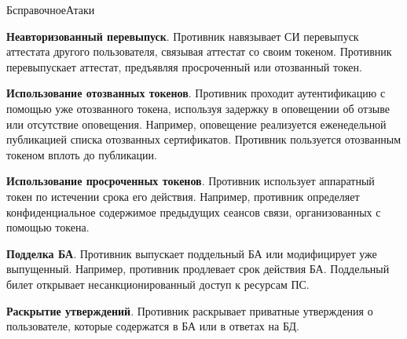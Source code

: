 \begin{appendix}{Б}{справочное}{Атаки}

{\bf Неавторизованный перевыпуск}. 
Противник навязывает СИ перевыпуск аттестата
другого пользователя, связывая аттестат со своим токеном.
Противник перевыпускает аттестат, предъявляя просроченный 
или отозванный токен.


{\bf Использование отозванных токенов}. 
Противник проходит аутентификацию с помощью уже отозванного токена,
используя задержку в оповещении об отзыве или отсутствие оповещения.
%
Например, оповещение реализуется еженедельной публикацией списка 
отозванных сертификатов. Противник пользуется отозванным токеном вплоть до 
публикации. 


{\bf Использование просроченных токенов}. 
Противник использует аппаратный токен по истечении срока его действия.
Например, противник определяет конфиденциальное содержимое предыдущих 
сеансов связи, организованных с помощью токена.


\label{ATK.TM}

{\bf Подделка БА}.
Противник выпускает поддельный БА или модифицирует уже выпущенный.
%
Например, противник продлевает срок действия БА.
%
Поддельный билет открывает несанкционированный доступ к ресурсам ПС.


{\bf Раскрытие утверждений}.
Противник раскрывает приватные утверждения о пользователе,
которые содержатся в БА или в ответах на БД.



\end{appendix}
